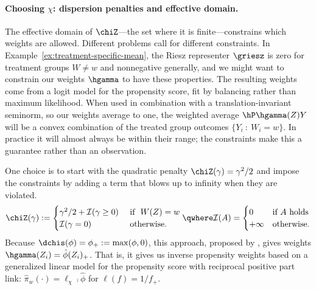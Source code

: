 \documentclass{article}
\begin{document}
\paragraph{Choosing $\chi$: dispersion penalties and effective domain.}
The effective domain of $\chiZ$---the set where it is finite---constrains which weights are allowed. Different problems call for different constraints. In Example~\ref{ex:treatment-specific-mean}, the Riesz representer $\griesz$ is zero for treatment groups $W\neq w$ and nonnegative generally, and we might want to constrain our weights $\hgamma$ to have these properties. The resulting weights come from a logit model for the propensity score, fit by balancing rather than maximum likelihood. When used in combination with a translation-invariant seminorm, so our weights average to one, the weighted average $\hP \hgamma(Z) Y$ will be a convex combination of the treated group outcomes $\{ Y_i \ : \ W_i = w\}$. In practice it will almost always be within their range; the constraints make this a guarantee rather than an observation.

One choice is to start with the quadratic penalty $\chiZ(\gamma)=\gamma^2/2$ and impose the constraints by adding a term that blows up to infinity when they are violated.
\begin{equation}
\chiZ(\gamma) :=
\begin{cases}
  \gamma^2/2 + \mathcal{I}(\gamma \ge 0) & \text{ if } \  W(Z)=w \\
  \mathcal{I}(\gamma=0)                  & \text{ otherwise. }
\end{cases}
\qwhere \mathcal{I}(A)=\begin{cases} 0 & \text{if } A \text{ holds} \\ +\infty & \text{otherwise.}\end{cases}
\end{equation}
Because $\dchis(\phi) = \phi_+ := \max(\phi,0)$, this approach, proposed by \citet{zubizarreta2015stable}, gives weights $\hgamma(Z_i) = \hat\phi(Z_i)_+$. That is, it gives us inverse propensity weights based on a generalized linear model for the propensity score with reciprocal positive part link: $\hat \pi_w(\cdot) = \ell_\chi \comp \hat \phi$ for $\ell(f)=1/f_+$.
\end{document}
